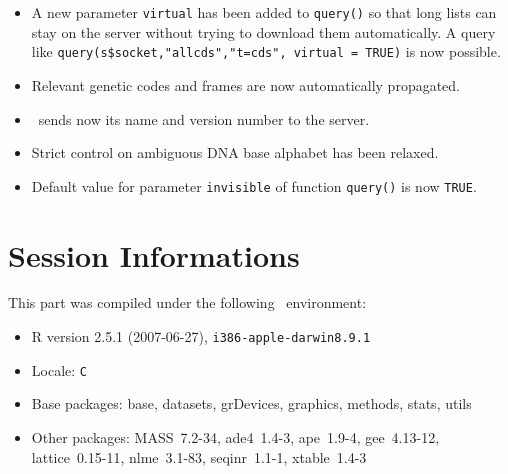 \documentclass{article}
\begin{document}
\begin{itemize}
\item A new parameter \texttt{virtual} has been added to \texttt{query()} 
so that long lists can stay on the server without trying to download
them automatically. A query like \texttt{query(s\$socket,"allcds","t=cds", virtual = TRUE)} is 
now possible.

\item Relevant genetic codes and frames are now automatically propagated.

\item \Seqinr{}~sends now its name and version number to the server.

\item Strict control on ambiguous DNA base alphabet has been relaxed.

\item Default value for parameter \texttt{invisible} of function \texttt{query()} is now \texttt{TRUE}.

\end{itemize}



\section{Session Informations}

This part was compiled under the following \Rlogo{}~environment:

\begin{itemize}
  \item R version 2.5.1 (2007-06-27), \verb|i386-apple-darwin8.9.1|
  \item Locale: \verb|C|
  \item Base packages: base, datasets, grDevices, graphics, methods,
    stats, utils
  \item Other packages: MASS~7.2-34, ade4~1.4-3, ape~1.9-4,
    gee~4.13-12, lattice~0.15-11, nlme~3.1-83, seqinr~1.1-1,
    xtable~1.4-3
\end{itemize}



\clearpage
{}


\end{document}
